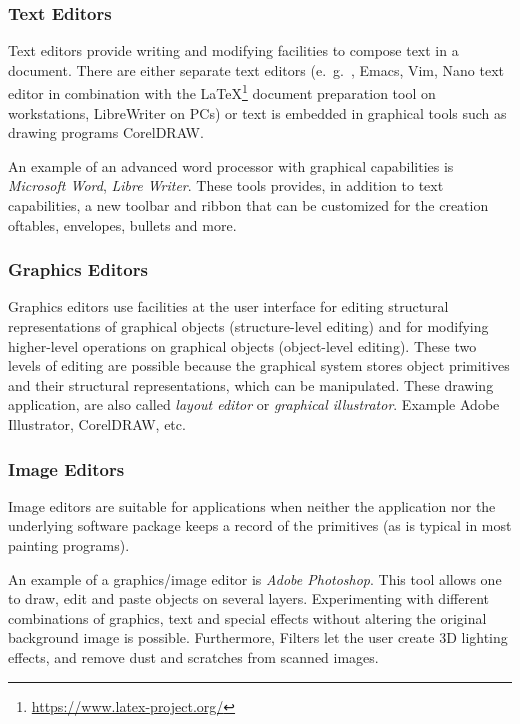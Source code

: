\subsubsection{Text Editors}
Text editors provide writing and modifying facilities to compose text in a document. There are either separate text editors (e.\ g.\ , Emacs, Vim, Nano text editor in combination  with the \LaTeX\footnote{ \url{https://www.latex-project.org/}} document preparation tool on workstations, LibreWriter on PCs) or text is embedded in graphical tools such as drawing programs CorelDRAW.


An example of an advanced word processor with graphical capabilities is \textit{Microsoft Word}, \textit{Libre Writer}. These tools provides, in addition to text capabilities, a new toolbar and ribbon that can be customized for the creation oftables, envelopes, bullets and more.

\subsubsection{Graphics Editors}
Graphics editors use facilities at the user interface for editing structural representations of graphical objects (structure-level editing) and for modifying higher-level
operations on graphical objects (object-level editing). These two levels of editing are possible because the graphical system stores object primitives and their structural
representations, which can be manipulated. These drawing application, are also called \textit{layout editor} or \textit{graphical illustrator}. Example Adobe Illustrator, CorelDRAW, etc.


\subsubsection{Image Editors}
Image editors are suitable for applications when neither the application nor the underlying software package keeps a record of the primitives (as is typical in most
painting programs).

An example of a graphics/image editor is \textit{Adobe Photoshop}. This tool allows one to draw, edit and paste objects on several layers. Experimenting with different
combinations of graphics, text and special effects without altering the original background image is possible. Furthermore, Filters let the user create 3D lighting
effects, and remove dust and scratches from scanned images.

